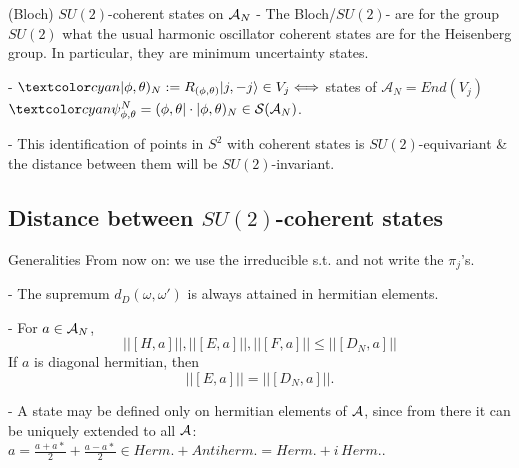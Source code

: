 \begin{frame}{(Bloch) $SU(2)$-coherent states on $\mathcal A_N$} %
- The Bloch/$SU(2)$- are for the group $SU(2)$ what the usual harmonic oscillator coherent states are for the Heisenberg group. In particular, they are minimum uncertainty states. 


-  $\lbtext{|\phi, \theta)_N} := R_{(\phi, \theta)}|j, -j\rangle \in V_j \Longleftrightarrow $ states of $\mathcal A_N = End(V_j)$ $\lbtext{\psi^N_{\phi, \theta}} = (\phi, \theta| \cdot |\phi, \theta)_N \in \mathcal S(\mathcal A_N)$. 

- This identification of points in $S^2$ with coherent states %
is $SU(2)$-equivariant \& the distance between them will be $SU(2)$-invariant.

\end{frame}

\subsection{Distance between $SU(2)$-coherent states}

\begin{frame}{Generalities} %
From now on: we use the irreducible s.t. and not write the $\pi_j$'s.

- The supremum $d_D(\omega, \omega')$ is always attained in hermitian elements.

- For $a \in \mathcal A_N$, 
\begin{equation} \label{ineqDN}
    ||[H, a]||, ||[E, a]||, ||[F, a]||  \leq ||[D_N, a]||
\end{equation} \label{eqDNdiag}
If $a$ is diagonal hermitian, then
\begin{equation}
    ||[E, a]|| = ||[D_N, a]||.
\end{equation}

- A state may be defined only on hermitian elements of $\mathcal A$, since from there it can be uniquely extended to all $\mathcal A$: $a = \frac{a+a*}{2} + \frac{a - a*}{2} \in Herm. + Antiherm. = Herm. + i\, Herm.$.

\end{frame}

